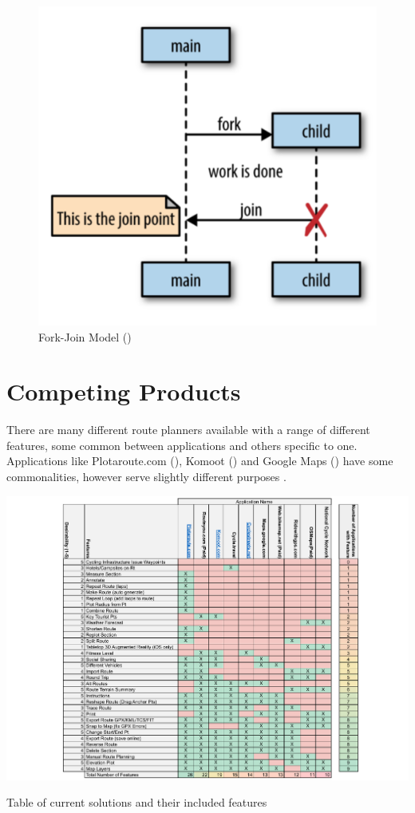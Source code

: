 \begin{figure}
    \centering
    \includegraphics[width=0.5\linewidth]{figures/fork-join.png}
    \caption{Fork-Join Model (\cite{cox-buday_concurrency_2017})}
    \label{fig:forkjoin}
\end{figure}

\section{Competing Products}
\label{litrev:competingproducts}

There are many different route planners available with a range of different features, some common between applications and others specific to one. Applications like Plotaroute.com (\cite{noauthor_free_nodate}), Komoot (\cite{noauthor_komoot_nodate}) and Google Maps (\cite{noauthor_google_nodate}) have some commonalities, however serve slightly different purposes .

\begin{table}[h!]
    \centering
    \includegraphics[width=1\linewidth]{figures/current_apps.pdf}
    \caption{Table of current solutions and their included features}
    \label{fig:solutionsandfeatures}
\end{table}

